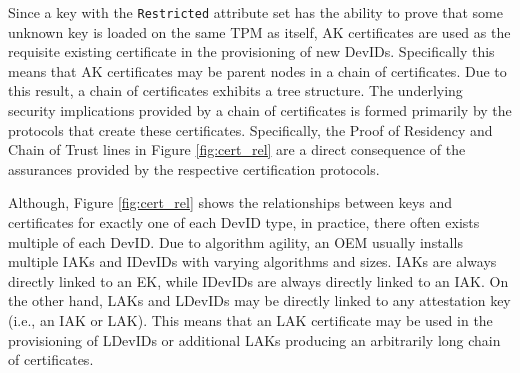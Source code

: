 \vspace{2em}
Since a key with the \verb|Restricted| attribute set has the ability to prove that some unknown key is loaded on the same TPM as itself, AK certificates are used as the requisite existing certificate in the provisioning of new DevIDs. Specifically this means that AK certificates may be parent nodes in a chain of certificates. Due to this result, a chain of certificates exhibits a tree structure.
The underlying security implications provided by a chain of certificates is formed primarily by the protocols that create these certificates. Specifically, the Proof of Residency and Chain of Trust lines in Figure \ref{fig:cert_rel} are a direct consequence of the assurances provided by the respective certification protocols.

Although, Figure \ref{fig:cert_rel} shows the relationships between keys and certificates for exactly one of each DevID type, in practice, there often exists multiple of each DevID. Due to algorithm agility, an OEM usually installs multiple IAKs and IDevIDs with varying algorithms and sizes. IAKs are always directly linked to an EK, while IDevIDs are always directly linked to an IAK. On the other hand, LAKs and LDevIDs may be directly linked to any attestation key (i.e., an IAK or LAK). This means that an LAK certificate may be used in the provisioning of LDevIDs or additional LAKs producing an arbitrarily long chain of certificates. 


